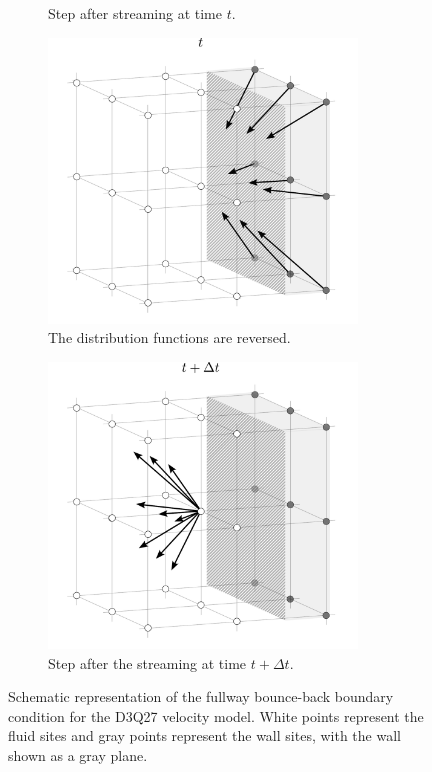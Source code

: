 \begin{figure}[h]
\begin{subfigure}{0.48\textwidth}
		\caption{Step after streaming at time $t$.}
		\label{fig:bbb}
	\end{subfigure}
	\par\bigskip
	\par\bigskip
	\begin{subfigure}{0.48\textwidth}
		\centering
		\includegraphics[width=0.9\textwidth, trim={0mm 0mm 0mm 0mm}]{figures/fwbbc.pdf}
		\caption{The distribution functions are reversed.}
		\label{fig:bbc}
	\end{subfigure}
	\begin{subfigure}{0.48\textwidth}
		\centering
		\includegraphics[width=0.9\textwidth, trim={0mm 0mm 0mm 0mm}]{figures/fwbbd.pdf}
		\caption{Step after the streaming at time $t + \Delta t$.}
		\label{fig:bbd}
	\end{subfigure}
	
	\caption{Schematic representation of the fullway bounce-back boundary condition for the D3Q27 velocity model. White points represent the fluid sites and gray points represent the wall sites, with the wall shown as a gray plane.}
\end{figure}


